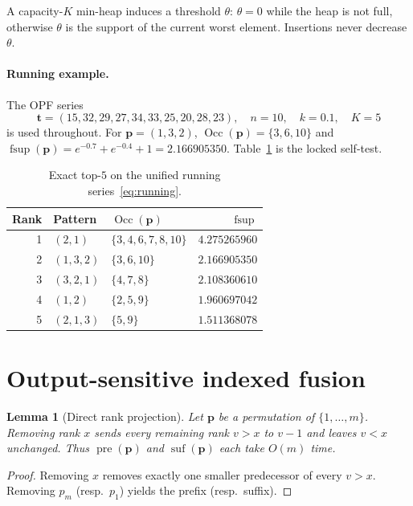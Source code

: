 \documentclass[preprint,12pt]{elsarticle}
\DeclareMathOperator{\fsup}{fsup}
\DeclareMathOperator{\Occ}{Occ}
\DeclareMathOperator{\pre}{pre}
\DeclareMathOperator{\suf}{suf}
\theoremstyle{plain}
\newtheorem{lemma}{Lemma}
\theoremstyle{definition}
\theoremstyle{remark}
\begin{document}
A capacity-$K$ min-heap induces a threshold $\theta$: $\theta=0$ while the heap is not full, otherwise $\theta$ is the support of the current worst element. Insertions never decrease $\theta$.

\paragraph{Running example.}
The OPF series
\begin{equation}
\label{eq:running}
\mathbf{t}=(15,32,29,27,34,33,25,20,28,23),\quad n=10,\quad k=0.1,\quad K=5
\end{equation}
is used throughout. For $\mathbf{p}=(1,3,2)$, $\Occ(\mathbf{p})=\{3,6,10\}$ and $\fsup(\mathbf{p})=e^{-0.7}+e^{-0.4}+1=2.166905350$. Table~\ref{tab:top5} is the locked self-test.

\begin{table}[t]
\caption{Exact top-$5$ on the unified running series~\eqref{eq:running}.}
\label{tab:top5}
\centering
\begin{tabular}{@{}rllr@{}}
\toprule
Rank & Pattern & $\Occ(\mathbf{p})$ & $\fsup$ \\
\midrule
1 & $(2,1)$ & $\{3,4,6,7,8,10\}$ & $4.275265960$ \\
2 & $(1,3,2)$ & $\{3,6,10\}$ & $2.166905350$ \\
3 & $(3,2,1)$ & $\{4,7,8\}$ & $2.108360610$ \\
4 & $(1,2)$ & $\{2,5,9\}$ & $1.960697042$ \\
5 & $(2,1,3)$ & $\{5,9\}$ & $1.511368078$ \\
\bottomrule
\end{tabular}
\end{table}

\section{Output-sensitive indexed fusion}
\label{sec:join}

\begin{lemma}[Direct rank projection]
\label{lem:proj}
Let $\mathbf{p}$ be a permutation of $\{1,\ldots,m\}$. Removing rank $x$ sends every remaining rank $v>x$ to $v-1$ and leaves $v<x$ unchanged. Thus $\pre(\mathbf{p})$ and $\suf(\mathbf{p})$ each take $O(m)$ time.
\end{lemma}
\begin{proof}
Removing $x$ removes exactly one smaller predecessor of every $v>x$. Removing $p_m$ (resp.\ $p_1$) yields the prefix (resp.\ suffix).
\end{proof}
\end{document}
